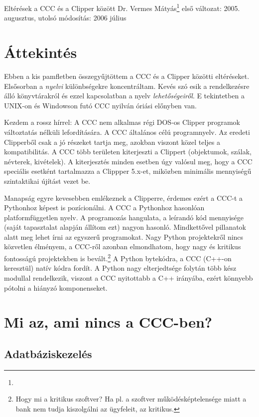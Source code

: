 
\pagetitle%
{Eltérések a CCC és a Clipper  között}%
{Dr. Vermes Mátyás\footnote{\ComFirm}}%
{első változat: 2005. augusztus, utolsó módosítás: 2006 július}

\section{Áttekintés}

Ebben a kis pamfletben összegyűjtöttem a CCC és a Clipper közötti 
eltéréseket. Elsősorban a {\em nyelvi\/} különbségekre koncentráltam. 
Kevés szó esik a rendelkezésre álló könyvtárakról és ezzel kapcsolatban 
a nyelv {\em lehetőségeiről}. E tekintetben a UNIX-on és Windowson 
futó CCC nyilván óriási előnyben van.

Kezdem a rossz hírrel: A CCC nem alkalmas  
régi DOS-os Clipper programok változtatás nélküli lefordítására. 
A CCC  általános célú programnyelv. Az eredeti Clipperből
csak a jó részeket tartja meg, azokban viszont közel teljes 
a kompatibilitás. 
A CCC több területen kiterjeszti a Clippert 
(objektumok, szálak, névterek, kivételek). A kiterjesztés minden esetben
úgy valósul meg, hogy a CCC speciális esetként tartalmazza
a Clippper 5.x-et, miközben minimális mennyiségű szintaktikai 
újítást vezet be. 

Manapság egyre kevesebben emlékeznek a Clipperre,
érdemes ezért a CCC-t a Pythonhoz képest is pozícionálni.
A CCC a Pythonhoz hasonlóan platformfüggetlen  nyelv.
A programozás hangulata, a leírandó kód mennyisége
(saját tapasztalat alapján állítom ezt) nagyon hasonló. 
Mindkettővel pillanatok alatt meg lehet írni az egyszerű
programokat. Nagy Python projektekről nincs közvetlen élményem,
a CCC-ről azonban elmondhatom, hogy nagy és kritikus fontosságú
projektekben is bevált.\footnote{Hogy mi a kritikus szoftver?
Ha pl. a szoftver  működésképtelensége miatt a bank 
nem tudja kiszolgálni az ügyfeleit, az kritikus.}
A Python bytekódra, a CCC (C++-on keresztül) natív kódra fordít. 
A Python nagy elterjedtsége folytán több kész modullal rendelkezik, 
viszont a CCC nyitottabb a C++ irányába, ezért könnyebb 
pótolni a hiányzó komponenseket. 


\section{Mi az, ami nincs a CCC-ben?}

\subsection{Adatbáziskezelés}

